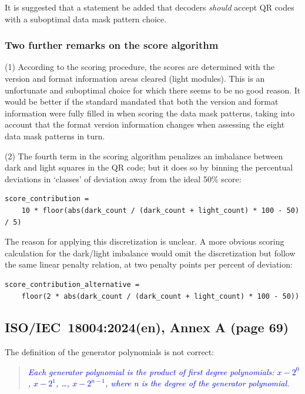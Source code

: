 \documentclass[a4paper,twoside]{article}
\newcommand{\shortstandard}{ISO/IEC~18004}
\newcommand{\standard}{\shortstandard:2024(en)}
\newcommand{\quotestandard}[1]{\textcolor{blue}{\textit{#1}}}
\begin{document}
It is suggested that a statement be added that decoders \emph{should} accept QR codes with a suboptimal data mask
pattern choice.

\subsubsection*{Two further remarks on the score algorithm}

(1) According to the scoring procedure, the scores are determined with the version and format information areas
cleared (light modules). This is an unfortunate and suboptimal choice for which there seems to be no good reason.
It would be better if the standard mandated that both the version and format information were fully filled in when 
scoring the data mask patterns, taking into account that the format version information changes when assessing
the eight data mask patterns in turn.

(2) The fourth term in the scoring algorithm penalizes an imbalance between dark and light
squares in the QR code; but it does so by binning the percentual deviations in `classes' of
deviation away from the ideal 50\% score:

\begin{verbatim}
score_contribution =
    10 * floor(abs(dark_count / (dark_count + light_count) * 100 - 50) / 5)
\end{verbatim}

The reason for applying this discretization is unclear. A more obvious scoring calculation for the
dark/light imbalance would omit the discretization but follow the same linear penalty relation,
at two penalty points per percent of deviation:

\begin{verbatim}
score_contribution_alternative =
    floor(2 * abs(dark_count / (dark_count + light_count) * 100 - 50))
\end{verbatim}

\subsection{\standard, Annex A (page 69)}

The definition of the generator polynomials is not correct:

\begin{quote}
\quotestandard{Each generator polynomial is the product of first degree polynomials: $x - 2^0$, $x - 2^1$, \dots, $x - 2^{n-1}$,
where n is the degree of the generator polynomial.}
\end{quote}
\end{document}
